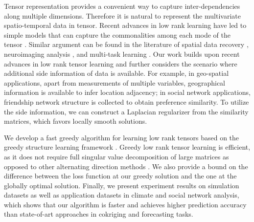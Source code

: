 Tensor representation provides a convenient way to capture inter-dependencies along multiple dimensions. Therefore it is natural to represent the multivariate spatio-temporal data  in tensor.  Recent advances in low rank learning have led to simple models that can  capture the commonalities among each mode of the tensor \cite{}. Similar argument can be found in the literature of spatial data recovery \cite{gandy2011tensor}, neuroimaging analysis \cite{zhou2013tensor}, and  multi-task learning \cite{romera2013multilinear}. Our work builds upon  recent advances in low rank tensor learning \cite{kolda2009tensor, gandy2011tensor, zhou2013tensor} and further considers the scenario where additional side information of data is available. For example, in geo-spatial applications, apart from measurements of multiple variables,  geographical information is available to infer location adjacency; in social network applications,  friendship network structure is collected to obtain preference similarity.  To utilize the side information, we can construct a Laplacian regularizer from the similarity matrices, which favors locally smooth solutions.

We develop a fast greedy algorithm for learning low rank tensors based on the greedy structure learning framework \cite{Barron2008,Zhang2011,Shwartz11}.  
Greedy low rank tensor learning is efficient, as it does not require full singular value decomposition of large matrices as opposed to other alternating direction methods \cite{refs for alternating direction methods}. 
We also provide a bound on the difference between the loss function at our greedy solution and the one at the globally optimal solution. %
 Finally, we present experiment results on simulation datasets as well as application datasets in  climate and social network analysis, which shows that our algorithm is faster and achieves higher prediction accuracy than state-of-art approaches in cokriging and forecasting tasks.

